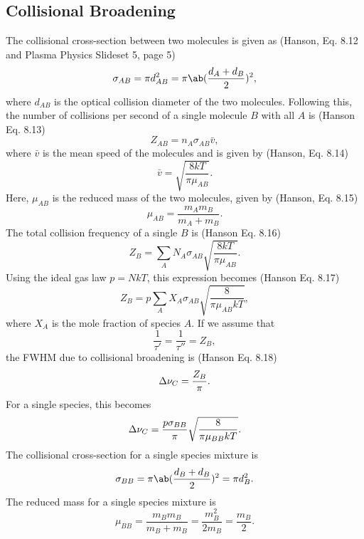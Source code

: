\documentclass[11pt, twoside, fleqn]{report}
\begin{document}
    \subsection{Collisional Broadening}

    The collisional cross-section between two molecules is given as (Hanson, Eq. 8.12 and Plasma Physics Slideset 5, page 5)
    \begin{equation*}
        \sigma_{AB} = \pi d_{AB}^2 = \pi\ab(\frac{d_A + d_B}{2})^2,
    \end{equation*}
    where $d_{AB}$ is the optical collision diameter of the two molecules. Following this, the number of collisions per second of a single molecule $B$ with all $A$ is (Hanson Eq. 8.13)
    \begin{equation*}
        Z_{AB} = n_A\sigma_{AB}\bar{v},
    \end{equation*}
    where $\bar{v}$ is the mean speed of the molecules and is given by (Hanson, Eq. 8.14)
    \begin{equation*}
        \bar{v} = \sqrt{\frac{8kT}{\pi\mu_{AB}}}.
    \end{equation*}
    Here, $\mu_{AB}$ is the reduced mass of the two molecules, given by (Hanson, Eq. 8.15)
    \begin{equation*}
        \mu_{AB} = \frac{m_Am_B}{m_A + m_B}.
    \end{equation*}
    The total collision frequency of a single $B$ is (Hanson Eq. 8.16)
    \begin{equation*}
        Z_B = \sum_AN_A\sigma_{AB}\sqrt{\frac{8kT}{\pi\mu_{AB}}}.
    \end{equation*}
    Using the ideal gas law $p = NkT$, this expression becomes (Hanson Eq. 8.17)
    \begin{equation*}
        Z_B = p\sum_AX_A\sigma_{AB}\sqrt{\frac{8}{\pi\mu_{AB}kT}},
    \end{equation*}
    where $X_A$ is the mole fraction of species $A$. If we assume that
    \begin{equation*}
        \frac{1}{\tau'} = \frac{1}{\tau''} = Z_B,
    \end{equation*}
    the FWHM due to collisional broadening is (Hanson Eq. 8.18)
    \begin{equation*}
        \adif{\nu}_C = \frac{Z_B}{\pi}.
    \end{equation*}
    For a single species, this becomes
    \begin{equation*}
        \adif{\nu}_C = \frac{p\sigma_{BB}}{\pi}\sqrt{\frac{8}{\pi\mu_{BB}kT}}.
    \end{equation*}
    The collisional cross-section for a single species mixture is
    \begin{equation*}
        \sigma_{BB} = \pi\ab(\frac{d_B + d_B}{2})^2 = \pi d_B^2.
    \end{equation*}
    The reduced mass for a single species mixture is
    \begin{equation*}
        \mu_{BB} = \frac{m_Bm_B}{m_B + m_B} = \frac{m_B^2}{2m_B} = \frac{m_B}{2}.
    \end{equation*}
\end{document}
